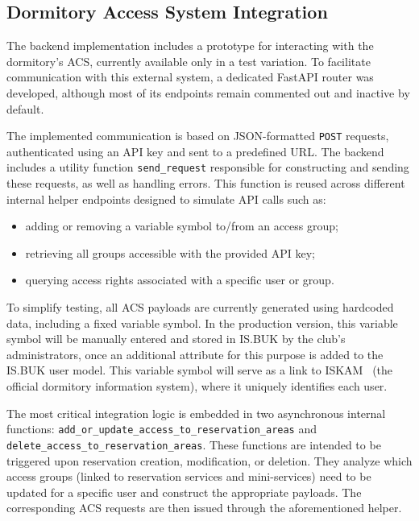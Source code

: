 \subsection{Dormitory Access System Integration}

The backend implementation includes a prototype for interacting with the dormitory's ACS, currently available only in a test variation. To facilitate communication with this external system, a dedicated FastAPI router was developed, although most of its endpoints remain commented out and inactive by default.

The implemented communication is based on JSON-formatted \texttt{POST} requests, authenticated using an API key and sent to a predefined URL. The backend includes a utility function \texttt{send\_request} responsible for constructing and sending these requests, as well as handling errors. This function is reused across different internal helper endpoints designed to simulate API calls such as:

\begin{itemize}
  \item adding or removing a variable symbol to/from an access group;
  \item retrieving all groups accessible with the provided API key;
  \item querying access rights associated with a specific user or group.
\end{itemize}

To simplify testing, all ACS payloads are currently generated using hardcoded data, including a fixed variable symbol. In the production version, this variable symbol will be manually entered and stored in IS.BUK by the club's administrators, once an additional attribute for this purpose is added to the IS.BUK user model. This variable symbol will serve as a link to ISKAM~\cite{ISKAM} (the official dormitory information system), where it uniquely identifies each user.

The most critical integration logic is embedded in two asynchronous internal functions:
\texttt{add\_or\_update\_access\_to\_reservation\_areas} and \texttt{delete\allowbreak\_access\allowbreak\_to\allowbreak\_reservation\allowbreak\_areas}. These functions are intended to be triggered upon reservation creation, modification, or deletion. They analyze which access groups (linked to reservation services and mini-services) need to be updated for a specific user and construct the appropriate payloads. The corresponding ACS requests are then issued through the aforementioned helper.

